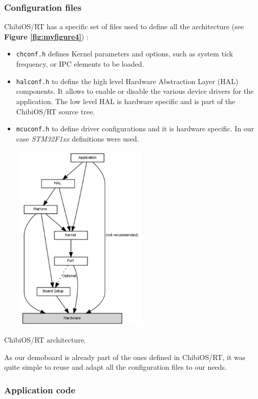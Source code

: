 \documentclass[a4paper,10pt]{article}
\makeatletter
\newenvironment{figurehere}{\def\@captype{figure}\vspace{2ex}}{\vspace{2ex}}
\makeatother
\begin{document}
\begin{multicols}{2}
\subsubsection{Configuration files}

ChibiOS/RT has a specific set of files used to define all the architecture (see {\bf Figure \ref{fig:myfigure4}}) \cite{chArch}:

\begin{itemize}
\item \texttt{chconf.h} defines Kernel parameters and options, such as system tick frequency, or IPC elements to be loaded.
\item \texttt{halconf.h} to define the high level Hardware Abstraction Layer (HAL) components. It allows to enable or disable the various device drivers for the application. The low level HAL is hardware specific and is part of the ChibiOS/RT source tree.
\item \texttt{mcuconf.h} to define driver configurations and it is hardware specific. In our case \textit{STM32F1xx} definitions were used.
\end{itemize}

\begin{figurehere}
 \centering
 \includegraphics[width=8cm, height=9cm]{./eps/architecture}
 \caption{ChibiOS/RT architecture.}
 \label{fig:myfigure4}
\end{figurehere}

As our demoboard is already part of the ones defined in ChibiOS/RT, it was quite simple to reuse and adapt all the configuration files to our needs.

\subsubsection{Application code}


\end{multicols}
\end{document}
